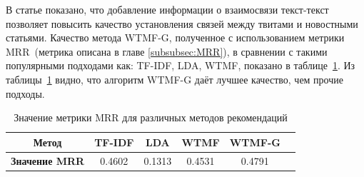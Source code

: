         В статье показано, что добавление информации о взаимосвязи текст-текст позволяет повысить качество установления связей между твитами и новостными статьями.
        Качество метода WTMF-G, полученное с использованием метрики MRR~(метрика описана в главе \ref{subsubsec:MRR}), в сравнении с такими популярными подходами как:
        TF-IDF, LDA, WTMF, показано в таблице~\ref{tabular:wtmfg_comparing}.
        Из таблицы~\ref{tabular:wtmfg_comparing} видно, что алгоритм WTMF-G даёт лучшее качество, чем прочие подходы.
        \begin{table}[ht!]
            \caption{Значение метрики MRR для различных методов рекомендаций\bigskip}
            \centering

            \label{tabular:wtmfg_comparing}
            \begin{tabular}{|c|c|c|c|c|c|} \hline
                \bf{Метод} & TF-IDF & LDA & WTMF & WTMF-G \\ \hline
                \bf{Значение MRR} & 0.4602 & 0.1313 & 0.4531 & 0.4791 \\ \hline
            \end{tabular}
        \end{table}